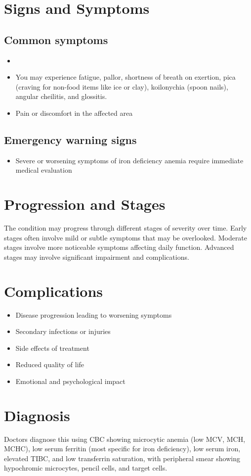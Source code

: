 \section{Signs and Symptoms}
\subsection{Common symptoms}
\begin{itemize}[noitemsep]
  \item \item You may experience fatigue, pallor, shortness of breath on exertion, pica (craving for non-food items like ice or clay), koilonychia (spoon nails), angular cheilitis, and glossitis.
  \item Pain or discomfort in the affected area
  \end{itemize}
\subsection{Emergency warning signs}
\begin{itemize}[noitemsep]
  \item Severe or worsening symptoms of iron deficiency anemia require immediate medical evaluation
\end{itemize}
\section{Progression and Stages}
The condition may progress through different stages of severity over time. Early stages often involve mild or subtle symptoms that may be overlooked. Moderate stages involve more noticeable symptoms affecting daily function. Advanced stages may involve significant impairment and complications.
\section{Complications}
\begin{itemize}[noitemsep]
  \item Disease progression leading to worsening symptoms
  \item Secondary infections or injuries
  \item Side effects of treatment
  \item Reduced quality of life
  \item Emotional and psychological impact
\end{itemize}
\section{Diagnosis}
Doctors diagnose this using CBC showing microcytic anemia (low MCV, MCH, MCHC), low serum ferritin (most specific for iron deficiency), low serum iron, elevated TIBC, and low transferrin saturation, with peripheral smear showing hypochromic microcytes, pencil cells, and target cells.

